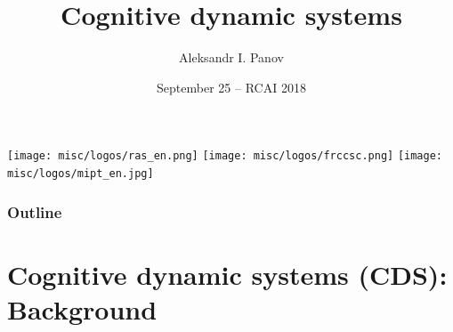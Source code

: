 \documentclass[default]{beamer}
\begin{document}
	
	\title[Cognitive dynamic systems]{Cognitive dynamic systems}
	\author[Aleksandr I. Panov]{Aleksandr I. Panov}
	\date[September 25 -- RCAI 2018]{September 25 -- RCAI 2018} 
		
	\begin{frame}
		\titlepage
		\centering
		\texttt{[image: misc/logos/ras\_en.png]} \hspace{10pt}
		\texttt{[image: misc/logos/frccsc.png]} \hspace{10pt}
		\texttt{[image: misc/logos/mipt\_en.jpg]}
	\end{frame}

	\begin{frame}
		\frametitle{Outline}
		\tiny
		\tableofcontents
	\end{frame}

	\section{Cognitive dynamic systems (CDS): Background}
\end{document}
